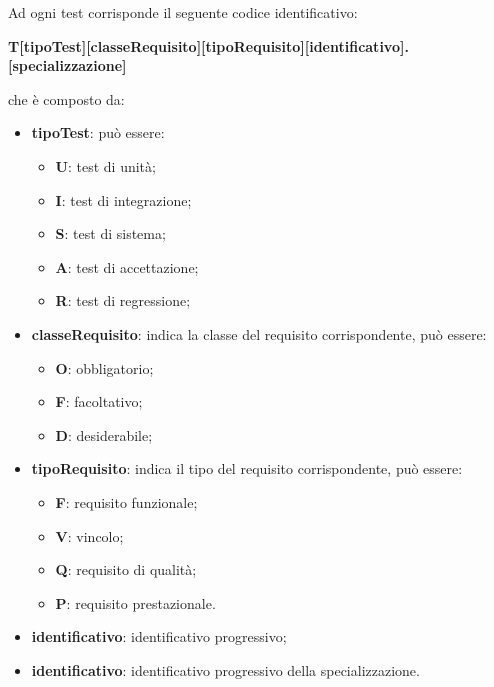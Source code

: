 	Ad ogni test corrisponde il seguente codice identificativo:\\
	
	\centerline{\textbf{T[tipoTest][classeRequisito][tipoRequisito][identificativo].[specializzazione]}}
	
	che è composto da:
	\begin{itemize}
	    \item \textbf{tipoTest}: può essere:
	    \begin{itemize}
	        \item \textbf{U}: test di unità;
	        \item \textbf{I}: test di integrazione;
	        \item \textbf{S}: test di sistema;
	        \item \textbf{A}: test di accettazione;
	        \item \textbf{R}: test di regressione;
	    \end{itemize}
	    \item \textbf{classeRequisito}: indica la classe del requisito corrispondente, può essere:
	        \begin{itemize}
	            \item \textbf{O}: obbligatorio;
	            \item \textbf{F}: facoltativo;
	            \item \textbf{D}: desiderabile;
	        \end{itemize}
	   \item \textbf{tipoRequisito}: indica il tipo del requisito corrispondente, può essere:
	        \begin{itemize}
	            \item \textbf{F}: requisito funzionale;
	            \item \textbf{V}: vincolo;
	            \item \textbf{Q}: requisito di qualità;
	            \item \textbf{P}: requisito prestazionale. 
	        \end{itemize}
	  \item \textbf{identificativo}: identificativo progressivo;
	  \item \textbf{identificativo}: identificativo progressivo della specializzazione.
	\end{itemize}
	

